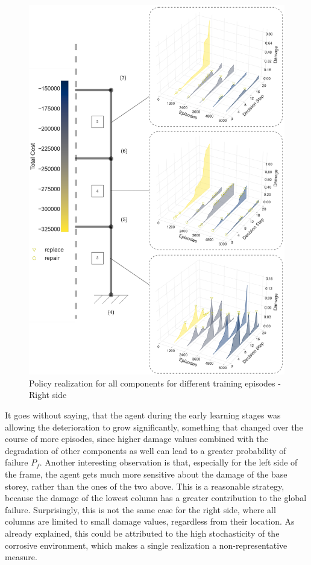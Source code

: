 \begin{figure}[H]
    \centering
    \includegraphics[width=.95\textwidth]{Figures/rightFrame.png}
	\caption{Policy realization for all components for different training episodes - Right side}
	\label{3dPolEpsR}
\end{figure}

It goes without saying, that the agent during the early learning stages was allowing the deterioration to grow significantly, something that changed over the course of more episodes, since higher damage values combined with the degradation of other components as well can lead to a greater probability of failure $P_f$. Another interesting observation is that, especially for the left side of the frame, the agent gets much more sensitive about the damage of the base storey, rather than the ones of the two above. This is a reasonable strategy, because the damage of the lowest column has a greater contribution to the global failure. Surprisingly, this is not the same case for the right side, where all columns are limited to small damage values, regardless from their location. As already explained, this could be attributed to the high stochasticity of the corrosive environment, which makes a single realization a non-representative measure.

